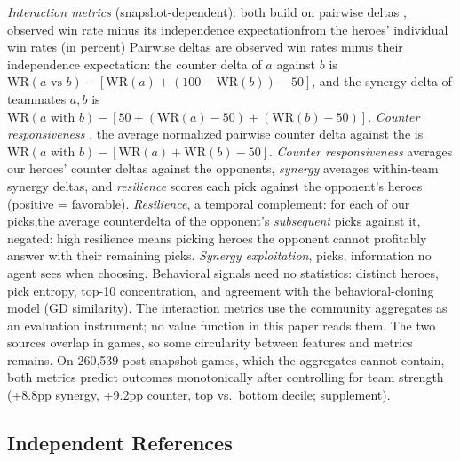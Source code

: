 \documentclass[journal]{IEEEtran}
\providecommand{\DIFaddtex}[1]{{\protect\color{blue} \sf #1}} %
\providecommand{\DIFdeltex}[1]{{\protect\color{red} \scriptsize #1}} %
\providecommand{\DIFaddbegin}{} %
\providecommand{\DIFaddend}{} %
\providecommand{\DIFdelbegin}{} %
\providecommand{\DIFdelend}{} %
\providecommand{\DIFadd}[1]{\texorpdfstring{\DIFaddtex{#1}}{#1}} %
\providecommand{\DIFdel}[1]{\texorpdfstring{\DIFdeltex{#1}}{}} %
\begin{document}
\DIFdel{\textit{Interaction metrics} (snapshot-dependent): both build on pairwise deltas , observed win rate minus its independence expectationfrom the heroes' individual win rates (in percent)}\DIFdelend \DIFaddbegin \DIFadd{Pairwise deltas are observed win rates minus their independence expectation}\DIFaddend : the counter delta of $a$ against $b$ is $\mathrm{WR}(a\text{ vs }b) - [\mathrm{WR}(a) + (100 - \mathrm{WR}(b)) - 50]$, and the synergy delta of teammates \DIFdelbegin \DIFdel{$a, b$ is $\mathrm{WR}(a\text{ with }b) - [50 + (\mathrm{WR}(a) - 50) + (\mathrm{WR}(b) - 50)]$. \textit{Counter responsiveness} , the average normalized pairwise counter delta against the }\DIFdelend \DIFaddbegin \DIFadd{is $\mathrm{WR}(a\text{ with }b) - [\mathrm{WR}(a) + \mathrm{WR}(b) - 50]$. \textit{Counter responsiveness} averages our heroes' counter deltas against the opponents, \textit{synergy} averages within-team synergy deltas, and \textit{resilience} scores each pick against the }\DIFaddend opponent's \DIFdelbegin \DIFdel{heroes (positive = favorable). \textit{Resilience}, a temporal complement: for each of our picks,the average counterdelta of the opponent's }\DIFdelend \textit{subsequent} \DIFdelbegin \DIFdel{picks against it, negated: high resilience means picking heroes the opponent cannot profitably answer with their remaining picks. \textit{Synergy exploitation}, }\DIFdelend \DIFaddbegin \DIFadd{picks, information no agent sees when choosing. Behavioral signals need no statistics: distinct heroes, pick entropy, top-10 concentration, and agreement with the behavioral-cloning model (GD similarity). The interaction metrics use the community aggregates as an evaluation instrument; no value function in this paper reads them. The two sources overlap in games, so some circularity between features and metrics remains. On 260,539 post-snapshot games, which the aggregates cannot contain, both metrics predict outcomes monotonically after controlling for team strength (+8.8pp synergy, +9.2pp counter, top vs.\ bottom decile; supplement).
}

\subsection{\DIFadd{Independent References}}
\label{sec:refs}
\end{document}
